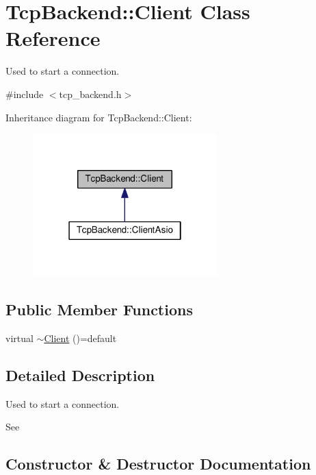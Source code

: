 \hypertarget{classTcpBackend_1_1Client}{}\section{Tcp\+Backend\+:\+:Client Class Reference}
\label{classTcpBackend_1_1Client}


Used to start a connection.  




{\ttfamily \#include $<$tcp\+\_\+backend.\+h$>$}



Inheritance diagram for Tcp\+Backend\+:\+:Client\+:
\nopagebreak
\begin{figure}[H]
\begin{center}
\leavevmode
\includegraphics[width=202pt]{classTcpBackend_1_1Client__inherit__graph}
\end{center}
\end{figure}
\subsection*{Public Member Functions}
\begin{DoxyCompactItemize}
\item 
virtual \hyperlink{classTcpBackend_1_1Client_a0556d5f3d8a2894860d9073409f9eae0}{$\sim$\+Client} ()=default
\end{DoxyCompactItemize}


\subsection{Detailed Description}
Used to start a connection. 

See  

\subsection{Constructor \& Destructor Documentation}
\mbox{\label{classTcpBackend_1_1Client_a0556d5f3d8a2894860d9073409f9eae0}} 
